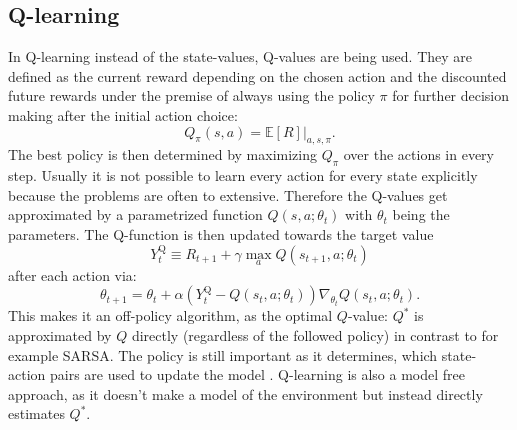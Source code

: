\subsection{Q-learning}
In Q-learning \cite{DBLP:journals/corr/HasseltGS15} instead of the state-values, Q-values are being used. They are defined as the current reward depending on the chosen action and the discounted future rewards under the premise of always using the policy $\pi$ for further decision making after the initial action choice:
\begin{equation}
Q_\pi(s,a)=\mathbb{E}\left[R\right]|_{a,s,\pi}.
\end{equation} 
The best policy is then determined by maximizing $Q_\pi$ over the actions in every step.
Usually it is not possible to learn every action for every state explicitly because the problems are often to extensive. Therefore the Q-values get approximated by a parametrized function $Q(s,a;\theta_t)$ with $\theta_t$ being the parameters. The Q-function is then updated towards the target value
\begin{equation}\label{eq:Q-target}Y_{t}^{\mathrm{Q}} \equiv R_{t+1}+\gamma \max _{a} Q\left(s_{t+1}, a ; \theta_{t}\right)
\end{equation}
after each action via:
\begin{equation}
\theta_{t+1}=\theta_{t}+\alpha\left(Y_{t}^{\mathrm{Q}}-Q\left(s_{t}, a; \theta_{t}\right)\right) \nabla_{\theta_{t}} Q\left(s_{t}, a ; \theta_{t}\right).
\end{equation}
This makes it an off-policy algorithm, as the optimal $Q$-value: $Q^*$ is approximated by $Q$ directly (regardless of the followed policy) in contrast to for example SARSA. The policy is still important as it determines, which state-action pairs are used to update the model \cite{Sutton:1998:IRL:551283}. 
Q-learning is also a model free approach, as it doesn't make a model of the environment but instead directly estimates $Q^*$.\\
